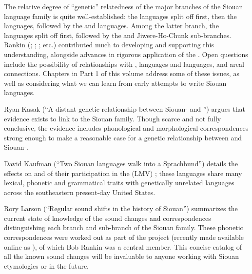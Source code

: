\begin{refsection}

The relative degree of ``genetic'' relatedness of the major branches of the Siouan language family is quite well-established: the  languages split off first, then the  languages, followed by the  and  languages. Among the latter branch, the  languages split off first, followed by the  and Jiwere-Ho-Chunk sub-branches. Rankin (\citeyear{Rankin1988}; \citeyear{Rankin1998macrosiouan}; \citealt{RankinEtAl1998}; etc.) contributed much to developing and supporting this understanding, alongside advances in rigorous application of the . Open questions include the possibility of relationships with ,  languages and  languages, and areal connections. Chapters in Part 1 of this volume address some of these issues, as well as considering what we can learn from early attempts to write Siouan languages.

Ryan Kasak (``A distant genetic relationship between Siouan- and '') argues that evidence exists to link  to the Siouan family. Though scarce and not fully conclusive, the evidence includes phonological and morphological correspondences strong enough to make a reasonable case for a genetic relationship between  and Siouan-. 

David Kaufman (``Two Siouan languages walk into a Sprachbund'') details the effects on  and  of their participation in the  (LMV) ; these languages share many lexical, phonetic and grammatical traits with genetically unrelated languages across the southeastern present-day United States. 

Rory Larson (``Regular sound shifts in the history of Siouan'') summarizes the current state of knowledge of the sound changes and correspondences distinguishing each branch and sub-branch of the Siouan family. These phonetic correspondences were worked out as part of the  project (recently made available online as \citet{Rankinetal2015AccessSeptember}), of which Bob Rankin was a central member. This concise catalog of all the known sound changes will be invaluable to anyone working with Siouan etymologies or  in the future.
\largerpage[-1]


\end{refsection}
